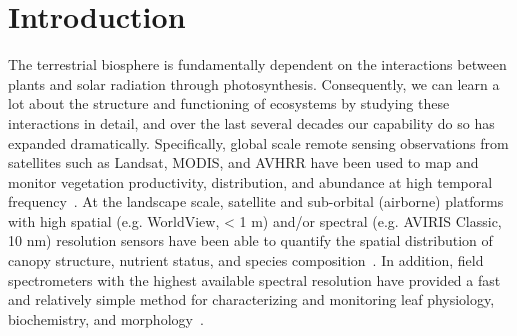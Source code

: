 \section{Introduction}\label{sec:pecanrtm-intro}

The terrestrial biosphere is fundamentally dependent on the interactions between plants and solar radiation through photosynthesis.
Consequently, we can learn a lot about the structure and functioning of ecosystems by studying these interactions in detail, and over the last several decades our capability do so has expanded dramatically.
Specifically, global scale remote sensing observations from satellites such as Landsat, MODIS, and AVHRR have been used to map and monitor vegetation productivity, distribution, and abundance at high temporal frequency~\cite{loveland_2000_development,friedl_2002_global,hansen_2010_quantification,houborg_2015_advances}.
At the landscape scale, satellite and sub-orbital (airborne) platforms with high spatial (e.g. WorldView, < 1 m) and/or spectral (e.g. AVIRIS Classic, 10 nm) resolution sensors have been able to quantify the spatial distribution of canopy structure, nutrient status, and species composition~\cite{asner_2015_quantifying,banskota_2015_inversion,singh_imaging_2015}.
In addition, field spectrometers with the highest available spectral resolution have provided a fast and relatively simple method for characterizing and monitoring leaf physiology, biochemistry, and morphology~\cite{serbin_2012_spectroscopic,couture_2013_spectroscopic,sullivan_2013_foliar,serbin_spectroscopic_2014,zhao_2014_early}.

